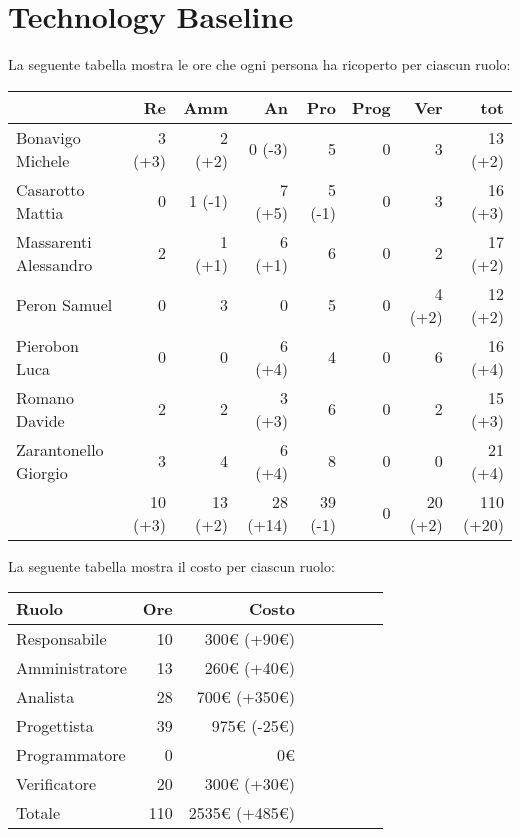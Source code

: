 \section{Technology Baseline}

La seguente tabella mostra le ore che ogni persona ha ricoperto per ciascun ruolo:

\begin{table}[ht]
    \begin{tabularx}{\linewidth}{X|rrrrrrr}
    \rowcolor{gray!30}& Re & Amm & An & Pro & Prog & Ver & tot \\
    \hline
    Bonavigo Michele                        & 3 (+3)  & 2 (+2)   & 0 (-3)    & 5       & 0     & 3       & 13 (+2) \\
    \rowcolor{gray!10}Casarotto Mattia      & 0       & 1 (-1)   & 7 (+5)    & 5 (-1)  & 0     & 3       & 16 (+3) \\
    Massarenti Alessandro                   & 2       & 1 (+1)   & 6 (+1)    & 6       & 0     & 2       & 17 (+2)  \\
    \rowcolor{gray!10}Peron Samuel          & 0       & 3        & 0         & 5       & 0     & 4 (+2)  & 12 (+2) \\
    Pierobon Luca                           & 0       & 0        & 6 (+4)    & 4       & 0     & 6       & 16 (+4) \\
    \rowcolor{gray!10}Romano Davide         & 2       & 2        & 3 (+3)    & 6       & 0     & 2       & 15 (+3) \\
    Zarantonello Giorgio                    & 3       & 4        & 6 (+4)    & 8       & 0     & 0       & 21 (+4) \\
    \hline                                  & 10 (+3) & 13 (+2)  & 28 (+14)  & 39 (-1) & 0     & 20 (+2) & 110 (+20)\\ 
    \end{tabularx}
\end{table}


La seguente tabella mostra il costo per ciascun ruolo:
\begin{table}[ht]
    \begin{tabularx}{\linewidth}{X|rrrrrrr}
    \rowcolor{gray!30}Ruolo & Ore & Costo \\
    \hline
    Responsabile                            & 10    & 300€ (+90€)\\
    \rowcolor{gray!10}Amministratore        & 13    & 260€ (+40€)\\
    Analista                                & 28    & 700€ (+350€)\\
    \rowcolor{gray!10}Progettista           & 39    & 975€ (-25€) \\
    Programmatore                           & 0     & 0€ \\
    \rowcolor{gray!10}Verificatore          & 20    & 300€ (+30€) \\
    \hline Totale                           & 110   & 2535€ (+485€) \\ 
    \end{tabularx}
\end{table}

